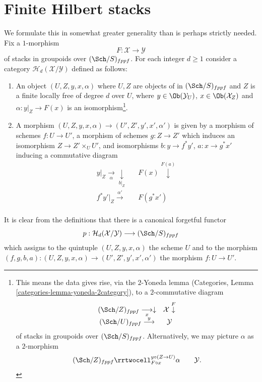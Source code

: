 \section{Finite Hilbert stacks}
\label{examples-stacks-section-hilbert-d-stack}
We formulate this in somewhat greater generality than is perhaps strictly
needed. Fix a $1$-morphism
$$
F : \mathcal{X} \longrightarrow \mathcal{Y}
$$
of stacks in groupoids over $(\Sch/S)_{fppf}$. For each integer
$d \geq 1$ consider a category $\mathcal{H}_d(\mathcal{X}/\mathcal{Y})$
defined as follows:
\begin{enumerate}
\item An object $(U, Z, y, x, \alpha)$ where $U, Z$ are objects of
in $(\Sch/S)_{fppf}$ and $Z$ is a finite locally free of degree
$d$ over $U$, where
$y \in \Ob(\mathcal{Y}_U)$, $x \in \Ob(\mathcal{X}_Z)$
and $\alpha : y|_Z \to F(x)$ is an isomorphism\footnote{
This means the data gives rise, via the $2$-Yoneda lemma
(Categories, Lemma \ref{categories-lemma-yoneda-2category}), to a
$2$-commutative diagram
$$
\begin{array}{cc}(\Sch/Z)_{fppf} \underset{x}{\longrightarrow}\downarrow & \mathcal{X} \overset{F}{\downarrow} \\ (\Sch/U)_{fppf} \overset{y}{\longrightarrow} & \mathcal{Y}\end{array}
$$
of stacks in groupoids over $(\Sch/S)_{fppf}$.
Alternatively, we may picture $\alpha$ as a $2$-morphism
$$
\begin{array}{ccc}(\Sch/Z)_{fppf}
\rrtwocell^{y \circ (Z \to U)}_{F \circ x}{\alpha} &  & \mathcal{Y}.\end{array}
$$
}.
\item A morphism $(U, Z, y, x, \alpha) \to (U', Z', y', x', \alpha')$ is
given by a morphism of schemes $f : U \to U'$, a morphism of schemes
$g : Z \to Z'$ which induces an isomorphism $Z \to Z' \times_U U'$,
and isomorphisms $b : y \to f^*y'$, $a : x \to g^*x'$ inducing a commutative
diagram
$$
\begin{array}{ccc}y|_Z \underset{\alpha}{\longrightarrow}\underset{b|_Z}{\downarrow} &  & F(x) \overset{F(a)}{\downarrow} \\ f^*y'|_Z \overset{\alpha'}{\longrightarrow} &  & F(g^*x') \\  &  & \end{array}
$$
\end{enumerate}
It is clear from the definitions that there is a canonical
forgetful functor
$$
p :
\mathcal{H}_d(\mathcal{X}/\mathcal{Y})
\longrightarrow
(\Sch/S)_{fppf}
$$
which assigns to the quintuple $(U, Z, y, x, \alpha)$ the scheme $U$
and to the morphism
$(f, g, b, a) : (U, Z, y, x, \alpha) \to (U', Z', y', x', \alpha')$
the morphism $f : U \to U'$.

